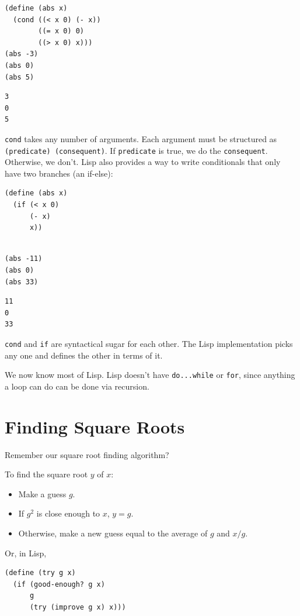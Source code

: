 \documentclass[9pt]{report}
\begin{document}
\begin{verbatim}
(define (abs x)
  (cond ((< x 0) (- x))
        ((= x 0) 0)
        ((> x 0) x)))
(abs -3)
(abs 0)
(abs 5)
\end{verbatim}

\begin{verbatim}
3
0
5
\end{verbatim}


\texttt{cond} takes any number of arguments. Each argument must be
structured as \texttt{(predicate) (consequent)}. If \texttt{predicate} is true,
we do the \texttt{consequent}. Otherwise, we don't. Lisp also provides a
way to write conditionals that only have two branches (an if-else):

\begin{verbatim}
(define (abs x)
  (if (< x 0)
      (- x)
      x))
\end{verbatim}

\begin{verbatim}

(abs -11)
(abs 0)
(abs 33)
\end{verbatim}

\begin{verbatim}
11
0
33
\end{verbatim}


\texttt{cond} and \texttt{if} are syntactical sugar for each other. The Lisp
implementation picks any one and defines the other in terms of it.

We now know most of Lisp. Lisp doesn't have \texttt{do...while} or \texttt{for},
since anything a loop can do can be done via recursion.

\section{Finding Square Roots}
\label{sec:orga714db0}

Remember our square root finding algorithm?

To find the square root \(y\) of \(x\):
\begin{itemize}
\item Make a guess \(g\).
\item If \(g^2\) is close enough to \(x\), \(y=g\).
\item Otherwise, make a new guess equal to the average of \(g\) and
\(x/g\).
\end{itemize}

Or, in Lisp,

\begin{verbatim}
(define (try g x)
  (if (good-enough? g x)
      g
      (try (improve g x) x)))
\end{verbatim}
\end{document}
